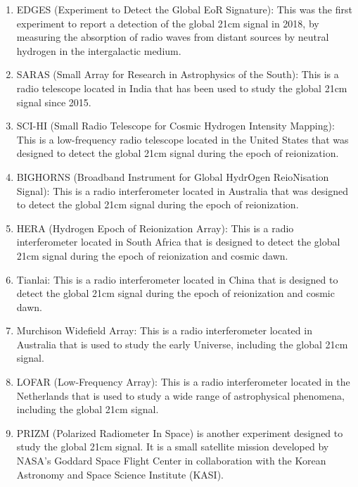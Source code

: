 \documentclass[12pt, TexShade, letterpaper]{report}
\begin{document}
\begin{enumerate}
\item EDGES (Experiment to Detect the Global EoR Signature): This was the first experiment to report a detection of the global 21cm signal in 2018, by measuring the absorption of radio waves from distant sources by neutral hydrogen in the intergalactic medium.

\item SARAS (Small Array for Research in Astrophysics of the South): This is a radio telescope located in India that has been used to study the global 21cm signal since 2015.

\item SCI-HI (Small Radio Telescope for Cosmic Hydrogen Intensity Mapping): This is a low-frequency radio telescope located in the United States that was designed to detect the global 21cm signal during the epoch of reionization.

\item BIGHORNS (Broadband Instrument for Global HydrOgen ReioNisation Signal): This is a radio interferometer located in Australia that was designed to detect the global 21cm signal during the epoch of reionization.

\item HERA (Hydrogen Epoch of Reionization Array): This is a radio interferometer located in South Africa that is designed to detect the global 21cm signal during the epoch of reionization and cosmic dawn.

\item Tianlai: This is a radio interferometer located in China that is designed to detect the global 21cm signal during the epoch of reionization and cosmic dawn.

\item Murchison Widefield Array: This is a radio interferometer located in Australia that is used to study the early Universe, including the global 21cm signal.

\item LOFAR (Low-Frequency Array): This is a radio interferometer located in the Netherlands that is used to study a wide range of astrophysical phenomena, including the global 21cm signal.
\item PRIZM (Polarized Radiometer In Space) is another experiment designed to study the global 21cm signal. It is a small satellite mission developed by NASA's Goddard Space Flight Center in collaboration with the Korean Astronomy and Space Science Institute (KASI).


\end{enumerate}
\end{document}
